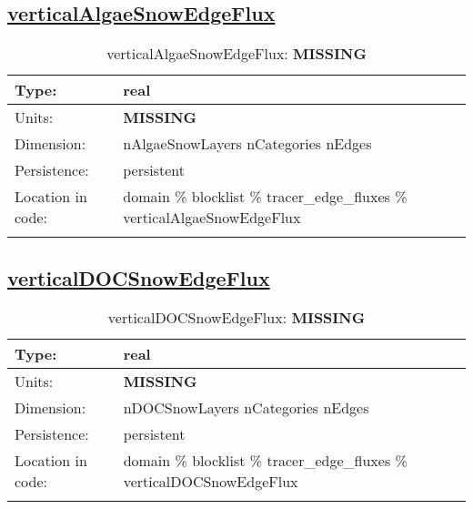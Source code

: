 \subsection[verticalAlgaeSnowEdgeFlux]{\hyperref[sec:var_tab_tracer_edge_fluxes]{verticalAlgaeSnowEdgeFlux}}
\label{subsec:var_sec_tracer_edge_fluxes_verticalAlgaeSnowEdgeFlux}
\begin{center}
\begin{longtable}{| p{2.0in} | p{4.0in} |}
        \hline 
        Type: & real \\
        \hline 
        Units: & {\bf \color{red} MISSING} \\
        \hline 
        Dimension: & nAlgaeSnowLayers nCategories nEdges \\
        \hline 
        Persistence: & persistent \\
        \hline 
         Location in code: & domain \% blocklist \% tracer\_edge\_fluxes \% verticalAlgaeSnowEdgeFlux \\
         \hline 
    \caption{verticalAlgaeSnowEdgeFlux: {\bf \color{red} MISSING}}
\end{longtable}
\end{center}
\subsection[verticalDOCSnowEdgeFlux]{\hyperref[sec:var_tab_tracer_edge_fluxes]{verticalDOCSnowEdgeFlux}}
\label{subsec:var_sec_tracer_edge_fluxes_verticalDOCSnowEdgeFlux}
\begin{center}
\begin{longtable}{| p{2.0in} | p{4.0in} |}
        \hline 
        Type: & real \\
        \hline 
        Units: & {\bf \color{red} MISSING} \\
        \hline 
        Dimension: & nDOCSnowLayers nCategories nEdges \\
        \hline 
        Persistence: & persistent \\
        \hline 
         Location in code: & domain \% blocklist \% tracer\_edge\_fluxes \% verticalDOCSnowEdgeFlux \\
         \hline 
    \caption{verticalDOCSnowEdgeFlux: {\bf \color{red} MISSING}}
\end{longtable}
\end{center}
